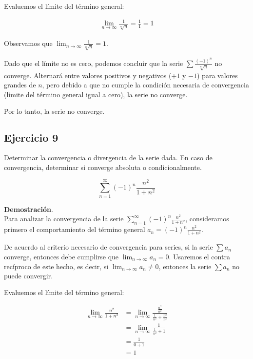 \documentclass{article}
\begin{document}
    Evaluemos el límite del término general:

    \begin{align*}
    \lim_{n \rightarrow \infty} \frac{1}{\sqrt[n]{n}} = \frac{1}{1} = 1
    \end{align*}

    Observamos que \( \lim_{n \rightarrow \infty} \frac{1}{\sqrt[n]{n}} = 1 \).

    Dado que el límite no es cero, podemos concluir que la serie \( \sum \frac{(-1)^{n}}{\sqrt[n]{n}} \) no converge. Alternará entre valores positivos y negativos (\(+1\) y \(-1\)) para valores grandes de \( n \), pero debido a que no cumple la condición necesaria de convergencia (límite del término general igual a cero), la serie no converge.

    Por lo tanto, la serie no converge.



    \subsection*{Ejercicio 9}

    Determinar la convergencia o divergencia de la serie dada. En caso de convergencia, determinar si converge absoluta o condicionalmente.

    $$
    \sum_{n=1}^{\infty}(-1)^{n} \frac{n^{2}}{1+n^{2}}
    $$

    \textbf{Demostración}.\\

    Para analizar la convergencia de la serie \(\sum_{n=1}^{\infty}(-1)^{n} \frac{n^{2}}{1+n^{2}}\), consideramos primero el comportamiento del término general \(a_n = (-1)^n \frac{n^2}{1+n^2}\).

    De acuerdo al criterio necesario de convergencia para series, si la serie \(\sum a_{n}\) converge, entonces debe cumplirse que \(\lim_{n \rightarrow \infty} a_{n} = 0\). Usaremos el contra recíproco de este hecho, es decir, si \(\lim_{n \rightarrow \infty} a_{n} \neq 0\), entonces la serie \(\sum a_{n}\) no puede convergir.

    Evaluemos el límite del término general:

    \begin{align*}
    \lim_{n \rightarrow \infty} \frac{n^{2}}{1+n^{2}} & = \lim_{n \rightarrow \infty} \frac{\frac{n^{2}}{n^{2}}}{\frac{1}{n^{2}}+\frac{n^{2}}{n^{2}}} \\
    & = \lim_{n \rightarrow \infty} \frac{1}{\frac{1}{n^{2}}+1} \\
    & = \frac{1}{0+1} \\
    & = 1
    \end{align*}
\end{document}
